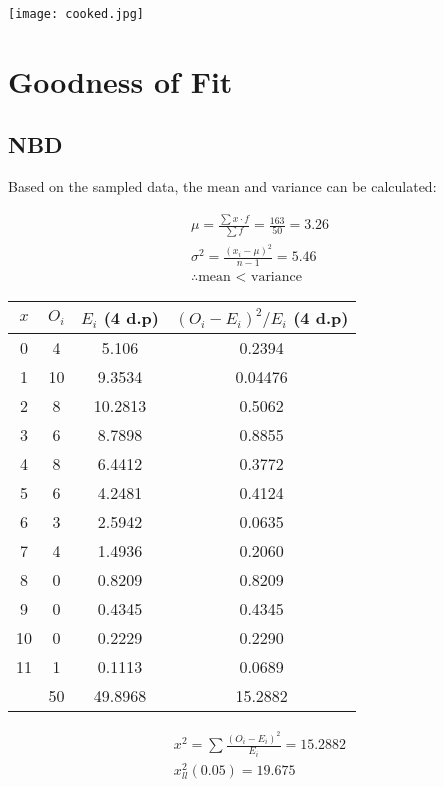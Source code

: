 \documentclass{article}
\begin{document}
\begin{center}
  \texttt{[image: cooked.jpg]}
\end{center}

\section{Goodness of Fit}

\subsection{NBD}

Based on the sampled data, the mean and variance can be calculated:

\begin{gather*}
  \mu = \frac{\sum x \cdot f}{\sum f} = \frac{163}{50} = 3.26 \\[5pt]
  \sigma^2 = \frac{(x_i - \mu)^2}{n - 1} = 5.46 \\[5pt]
  \therefore \text{mean < variance}
\end{gather*}

\begin{center}
  \begin{tabular}{|c|c|c|c|}
    \hline
    $x$ & $O_i$ & $ E_i $ (4 d.p) & $ (O_i - E_i)^2 / E_i $ (4 d.p) \\
    \hline 
    \hline 
    0  & 4  & 5.106   & 0.2394 \\
    1  & 10 & 9.3534  & 0.04476 \\
    2  & 8  & 10.2813 & 0.5062 \\
    3  & 6  & 8.7898  & 0.8855 \\
    4  & 8  & 6.4412  & 0.3772 \\
    5  & 6  & 4.2481  & 0.4124 \\
    6  & 3  & 2.5942  & 0.0635 \\
    7  & 4  & 1.4936  & 0.2060 \\
    8  & 0  & 0.8209  & 0.8209 \\
    9  & 0  & 0.4345  & 0.4345 \\
    10 & 0  & 0.2229  & 0.2290 \\
    11 & 1  & 0.1113  & 0.0689 \\
    \hline
    \hline
       & 50 & 49.8968 & 15.2882  \\
    \hline
  \end{tabular}
\end{center}

\begin{gather*}
  x^2 = \sum \frac{(O_i - E_i)^2}{E_i} = 15.2882 \\[5pt]
  x^2_{ll} (0.05) = 19.675 \\[5pt]
\end{gather*}
\end{document}
